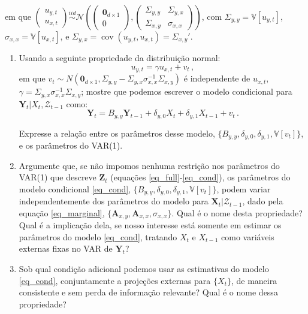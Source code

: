 \documentclass[10pt,a4paper]{article}
\begin{document}
\begin{enumerate}
em que $\begin{pmatrix}
	u_{y,t} \\
	u_{x,t}
	\end{pmatrix} \overset{iid}{\sim} \mathcal{N}\left(\begin{pmatrix}\boldsymbol{0}_{d\times 1} \\ 0\end{pmatrix},\begin{pmatrix}
\Sigma_{y,y} & \Sigma_{y,x} \\
\Sigma_{x,y}& \sigma_{x,x}
	\end{pmatrix}\right)$, com $\Sigma_{y,y} = \mathbb{V}[u_{y,t}]$, $\sigma_{x,x} = \mathbb{V}[u_{x,t}]$, e $\Sigma_{y,x} = \operatorname{cov}(u_{y,t},u_{x,t}) = \Sigma_{x,y}'$.
	
	\begin{enumerate}
		\item Usando a seguinte propriedade da distribuição normal:
		$$u_{y,t} = \gamma u_{x,t} + v_t\, ,$$
		em que $v_t \sim N(\boldsymbol{0}_{d\times 1}, \Sigma_{y,y} - \Sigma_{y,x}\sigma_{x,x}^{-1}\Sigma_{x,y})$ é independente de $u_{x,t}$, $\gamma = \Sigma_{y,x}\sigma_{x,x}^{-1} \Sigma_{x,y}$; mostre que podemos escrever o modelo condicional para $\boldsymbol{Y}_t|X_t,\mathcal{Z}_{t-1}$ como:
	\begin{equation}
		\label{eq_cond}
		\boldsymbol{Y}_t = {B}_{y,y}\boldsymbol{Y}_{t-1} +\delta_{y,0}X_t + \delta_{y,1} X_{t-1}+ v_{t}\, .
	\end{equation}
	
	Expresse a relação entre os parâmetros desse modelo, $\{B_{y,y}, \delta_{y,0}, \delta_{y,1}, \mathbb{V}[v_t]\}$, e os parâmetros do VAR(1).
	\item Argumente que, se não impomos nenhuma restrição nos parâmetros do VAR(1) que descreve $\boldsymbol{Z}_t$ (equações \eqref{eq_full}-\eqref{eq_cond}), os parâmetros do modelo condicional \eqref{eq_cond},  $\{B_{y,y}, \delta_{y,0}, \delta_{y,1}, \mathbb{V}[v_t]\}$,  podem variar independentemente dos parâmetros do modelo para $\boldsymbol{X}_t|\mathcal{Z}_{t-1}$, dado pela equação \eqref{eq_marginal}, $\{\boldsymbol{A}_{x,y}, \boldsymbol{A}_{x,x}, \sigma_{x,x}\}$. Qual é o nome desta propriedade? Qual é a implicação dela, se nosso interesse está somente em estimar os parâmetros do modelo \eqref{eq_cond}, tratando $X_t$ e $X_{t-1}$ como variáveis externas fixas no VAR de $\boldsymbol{Y}_t$?
	\item Sob qual condição adicional podemos usar as estimativas do modelo \eqref{eq_cond}, conjuntamente a projeções externas para $\{X_t\}$, de maneira consistente e sem perda de informação relevante? Qual é o nome dessa propriedade?
		

\end{enumerate}
\end{enumerate}
\end{document}
